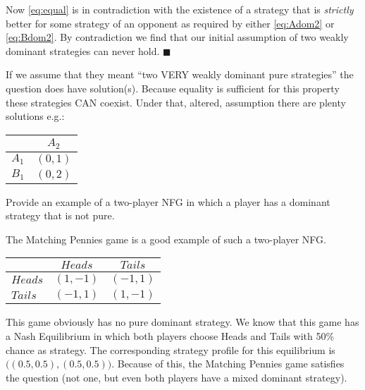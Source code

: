\documentclass[../main.tex]{subfiles}
\begin{document}
\begin{solution}
	Now \autoref{eq:equal} is in contradiction with the existence of a strategy that is \emph{strictly} better for some strategy of an opponent as required by either \autoref{eq:Adom2} or \autoref{eq:Bdom2}.
	By contradiction we find that our initial assumption of two weakly dominant strategies can never hold. $\blacksquare$

	If we assume that they meant ``two VERY weakly dominant pure strategies'' the question does have solution(s). Because equality is sufficient for this property these strategies CAN coexist.
	Under that, altered, assumption there are plenty solutions e.g.: 
        \begin{center}
    	    \begin{tabular}{|l|c|}
    	    \hline
    	    & $A_2$ \\
    	    \hline
			$A_1$ & $(0,1)$\\
    	    \hline
    	    $B_1$ & $(0,2)$\\
    	    \hline
    	    \end{tabular}
        \end{center}

\end{solution}

\begin{question}
Provide an example of a two-player NFG in which a player has a dominant strategy that is not pure.
\end{question}

\begin{solution}
The Matching Pennies game is a good example of such a two-player NFG.
        \begin{center}
    	    \begin{tabular}{|l|c|c|}
    	    \hline
    	    & $Heads$ & $Tails$ \\
    	    \hline
    	    $Heads$ & $(1,-1)$ & $(-1,1)$ \\
    	    \hline
    	    $Tails$ & $(-1,1)$ & $(1,-1)$ \\
    	    \hline
    	    \end{tabular}
        \end{center}
This game obviously has no pure dominant strategy.
We know that this game has a Nash Equilibrium in which both players choose Heads and Tails with 50\% chance as strategy.
The corresponding strategy profile for this equilibrium is $\big((0.5,0.5), (0.5,0.5)\big)$.
Because of this, the Matching Pennies game satisfies the question (not one, but even both players have a mixed dominant strategy).
\end{solution}
\end{document}
